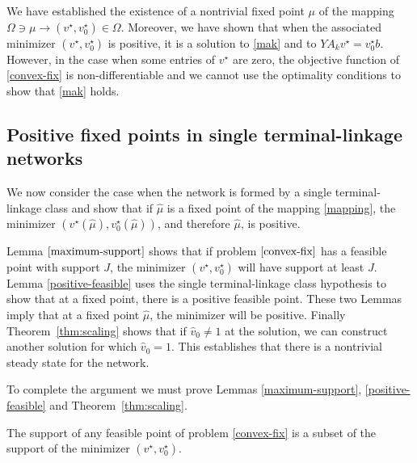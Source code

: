 \documentclass[smallextended]{svjour3}       %
\newcommand*{\0}{\mathbf{0}}
\newcommand*{\1}{\mathbf{1}}
\begin{document}
We have established the existence of a nontrivial fixed point $\mu$ of the
mapping $\Omega \ni \mu \rightarrow (v^\star,v^\star_0)\in \Omega$. Moreover,
we have shown that when the associated minimizer $(v^\star,v^\star_0)$ is
positive, it is a solution to \eqref{mak} and to
$YA_kv^\star=v^\star_0b$.  However, in the case when some entries of $v^\star$
are zero, the objective function of \eqref{convex-fix} is non-differentiable
and we cannot use the optimality conditions to show that \eqref{mak} holds. 


\subsection{Positive fixed points in single terminal-linkage networks}  
\label{section:single-linkage}

We now consider the case when the network is formed by a single
terminal-linkage class and show that if $\hat \mu$ is a fixed point of the
mapping \eqref{mapping}, the minimizer $(v^\star(\hat
\mu),v^\star_0(\hat\mu))$, and therefore $\hat\mu$, is positive.

Lemma $\ref{maximum-support}$ shows that if problem $\eqref{convex-fix}$ has a
feasible point with support $J$, the minimizer $(v^\star,v^\star_0)$ will have
support at least $J$. Lemma \ref{positive-feasible} uses the single
terminal-linkage class hypothesis to show that at a fixed point, there is a
positive feasible point.  These two Lemmas imply that at a fixed point
$\hat{\mu}$, the minimizer will be positive.  Finally Theorem~\ref{thm:scaling}
shows that if $\hat{v}_0 \neq 1$ at the solution, we can construct another
solution for which $\hat{v}_0=1$. This establishes that there is a nontrivial
steady state for the network. 

To complete the argument we must prove Lemmas \ref{maximum-support},
\ref{positive-feasible} and Theorem~\ref{thm:scaling}.

\begin{lemma} 
	The support of any feasible point of problem \eqref{convex-fix} is a subset
	of the support of the minimizer $(v^\star,v^\star_0)$. 
	\label{maximum-support}
\end{lemma}
\end{document}
